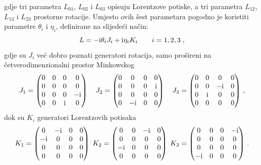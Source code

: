 gdje tri parametra $L_{01}$, $L_{02}$ i $L_{03}$ opisuju Lorentzove
potiske, a tri parametra $L_{12}$, $L_{13}$ i $L_{23}$ prostorne rotacije.
Umjesto ovih šest parametara pogodno je koristiti parametre
$\theta_i$ i $\eta_i$,  definirane na slijedeći način:
\begin{equation}
 L = -\textrm{i} \theta_i J_i + \textrm{i} \eta_i K_i  \qquad i=1,2,3  \;,
\label{eq:LJK}
\end{equation}
gdje su $J_i$ već dobro poznati generatori rotacija, samo prošireni
na četverodimenzionalni prostor Minkowskog
\begin{equation}
 J_1 =
\begin{pmatrix}
0 & 0 & 0 & 0 \\
0 & 0 & 0 & 0 \\
0 & 0 & 0 & -\textrm{i} \\
0 & 0 & \textrm{i} & 0
\end{pmatrix} \quad
 J_2 =
\begin{pmatrix}
0 & 0 & 0 & 0 \\
0 & 0 & 0 & \textrm{i} \\
0 & 0 & 0 & 0 \\
0 & -\textrm{i} & 0 & 0
\end{pmatrix} \quad
J_3 =
\begin{pmatrix}
0 & 0 & 0 & 0 \\
0 & 0 & -\textrm{i} & 0 \\
0 & \textrm{i} & 0 & 0 \\
0 & 0 & 0 & 0
\label{eq:defJi}
\end{pmatrix} \,,
\end{equation}
dok su $K_i$ generatori Lorentzovih potisaka
\begin{equation}
K_1 =
\begin{pmatrix}
0 & -\textrm{i} & 0 & 0 \\
-\textrm{i} & 0 & 0 & 0 \\
0 & 0 & 0 & 0 \\
0 & 0 & 0 & 0
\end{pmatrix} \;
K_2=
\begin{pmatrix}
0 & 0 & -\textrm{i} & 0 \\
0 & 0 & 0 & 0 \\
-\textrm{i} & 0 & 0 & 0 \\
0 & 0 & 0 & 0
\end{pmatrix} \;
K_3 =
\begin{pmatrix}
0 & 0 & 0 & -\textrm{i} \\
0 & 0 & 0 & 0 \\
0 & 0 & 0 & 0 \\
-\textrm{i} & 0 & 0 & 0
\end{pmatrix} \,.
\label{eq:defKi}
\end{equation}

